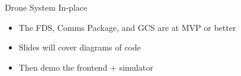 




\begin{frame}{Drone System In-place}
    \begin{itemize}
        \item The FDS, Comms Package, and GCS are at MVP or better
        \item Slides will cover diagrams of code
        \item Then demo the frontend + simulator
    \end{itemize}    
\end{frame}

